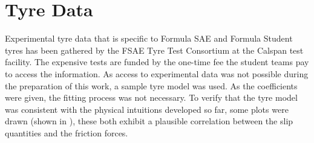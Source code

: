 \section{Tyre Data}
\label{sec:tyredata}

Experimental tyre data that is specific to Formula SAE and Formula Student tyres has been gathered by the FSAE Tyre Test Consortium  at the Calspan test facility. The expensive tests are funded by the one-time fee the student teams pay to access the information.
As access to experimental data was not possible during the preparation of this work, a sample tyre model was used. As the coefficients were given, the fitting process was not necessary.
To verify that the tyre model was consistent with the physical intuitions developed so far, some plots were drawn (shown in ), these both exhibit a plausible correlation between the slip quantities and the friction forces.
